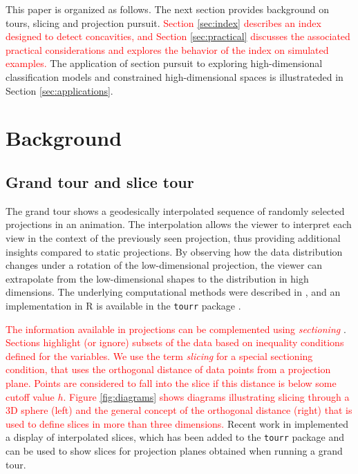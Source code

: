 \documentclass[]{interact}
\theoremstyle{plain}%
\theoremstyle{definition}
\theoremstyle{remark}
\begin{document}
This paper is organized as follows. The next section provides background
on tours, slicing and projection pursuit.
\textcolor{red}{Section \ref{sec:index} describes an index designed to detect concavities, and Section \ref{sec:practical} discusses the associated practical considerations and explores the behavior of the index on simulated examples.}
The application of section pursuit to exploring high-dimensional
classification models and constrained high-dimensional spaces is
illustrateded in Section \ref{sec:applications}.

\hypertarget{background}{%
\section{\texorpdfstring{Background
\label{sec:background}}{Background }}\label{background}}

\hypertarget{grand-tour-and-slice-tour}{%
\subsection{Grand tour and slice tour}\label{grand-tour-and-slice-tour}}

The grand tour shows a geodesically interpolated sequence of randomly
selected projections in an animation. The interpolation allows the
viewer to interpret each view in the context of the previously seen
projection, thus providing additional insights compared to static
projections. By observing how the data distribution changes under a
rotation of the low-dimensional projection, the viewer can extrapolate
from the low-dimensional shapes to the distribution in high dimensions.
The underlying computational methods were described in \citet{BCAH05},
and an implementation in R \citep{rlang} is available in the
\texttt{tourr} package \citep{tourr}.

\textcolor{red}{The information available in projections can be complemented using \textit{sectioning}}
\citep{prosection}.
\textcolor{red}{Sections highlight (or ignore) subsets of the data based on inequality conditions defined for the variables. We use the term \textit{slicing} for a special sectioning condition, that uses the orthogonal distance of data points from a projection plane. Points are considered to fall into the slice if this distance is below some cutoff value $h$. Figure \ref{fig:diagrams} shows diagrams illustrating slicing through a 3D sphere (left) and the general concept of the orthogonal distance (right) that is used to define slices in more than three dimensions.}
Recent work in \citet{laa2019slice} implemented a display of
interpolated slices, which has been added to the \texttt{tourr} package
and can be used to show slices for projection planes obtained when
running a grand tour.
\end{document}
